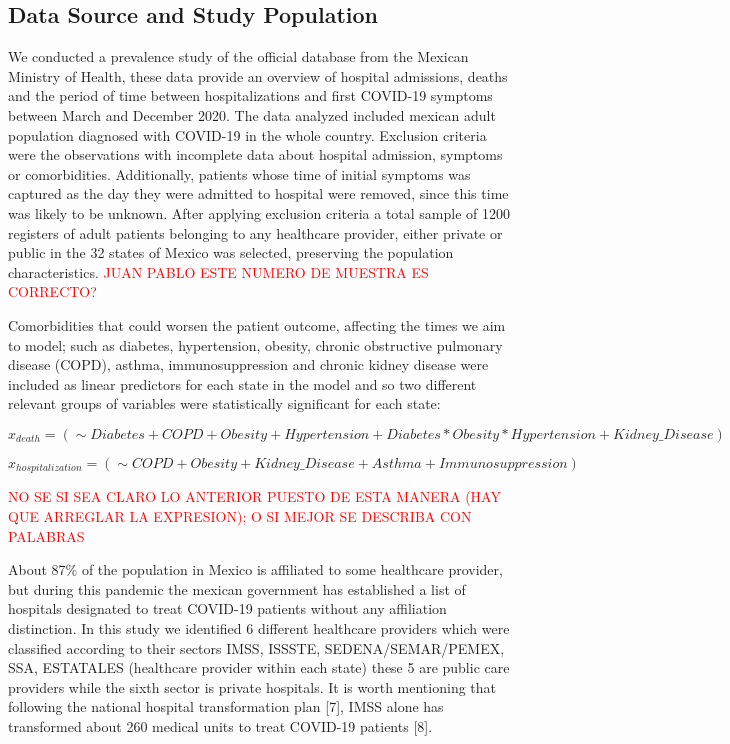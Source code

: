 \documentclass[10pt,letterpaper]{article}
\begin{document}
\subsection{Data Source and Study
Population}\label{data-source-and-study-population}

We conducted a prevalence study of the official database from the
Mexican Ministry of Health, these data provide an overview of hospital
admissions, deaths and the period of time between hospitalizations and
first COVID-19 symptoms between March and December 2020. The data
analyzed included mexican adult population diagnosed with COVID-19 in
the whole country. Exclusion criteria were the observations with
incomplete data about hospital admission, symptoms or comorbidities.
Additionally, patients whose time of initial symptoms was captured as
the day they were admitted to hospital were removed, since this time was
likely to be unknown. After applying exclusion criteria a total sample
of 1200 registers of adult patients belonging to any healthcare
provider, either private or public in the 32 states of Mexico was
selected, preserving the population characteristics.
\textcolor{red}{JUAN PABLO ESTE NUMERO DE
MUESTRA ES CORRECTO?}

Comorbidities that could worsen the patient outcome, affecting the times
we aim to model; such as diabetes, hypertension, obesity, chronic
obstructive pulmonary disease (COPD), asthma, immunosuppression and
chronic kidney disease were included as linear predictors for each state
in the model and so two different relevant groups of variables were
statistically significant for each state:

\[x_{death} = (\sim Diabetes+COPD+Obesity+Hypertension+Diabetes*Obesity*Hypertension+Kidney\_Disease)\]

\[
  x_{hospitalization} = (\sim COPD+Obesity + Kidney\_Disease+Asthma+Immunosuppression)\]

\textcolor{red}{NO SE SI SEA CLARO LO ANTERIOR PUESTO DE ESTA MANERA (HAY QUE ARREGLAR LA EXPRESION); O SI MEJOR SE DESCRIBA CON PALABRAS}

About 87\% of the population in Mexico is affiliated to some healthcare
provider, but during this pandemic the mexican government has
established a list of hospitals designated to treat COVID-19 patients
without any affiliation distinction. In this study we identified 6
different healthcare providers which were classified according to their
sectors IMSS, ISSSTE, SEDENA/SEMAR/PEMEX, SSA, ESTATALES (healthcare
provider within each state) these 5 are public care providers while the
sixth sector is private hospitals. It is worth mentioning that following
the national hospital transformation plan {[}7{]}, IMSS alone has
transformed about 260 medical units to treat COVID-19 patients {[}8{]}.
\end{document}
